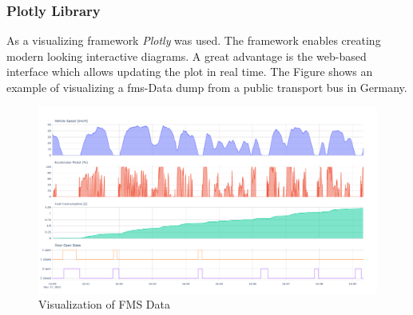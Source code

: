 \subsubsection{Plotly Library}
As a visualizing framework \textit{Plotly} was used. The framework enables creating modern looking interactive diagrams. A great advantage is the web-based interface which allows updating the plot in real time. The Figure shows an example of visualizing a \acrshort{fms}-Data dump from a public transport bus in Germany.

\begin{figure}[h!]
	\centering
	\hfuzz=15.0pt
	\includegraphics[width=\textwidth]{images/FMS_Data_Visualization.pdf}
	\caption{Visualization of FMS Data}
	\label{fig:fms_visualization}
\end{figure}
\newpage
